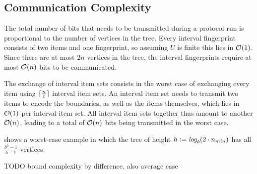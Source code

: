 \subsection{Communication Complexity}

The total number of bits that needs to be transmitted during a protocol run is proportional to the number of vertices in the tree. Every interval fingerprint consists of two items and one fingerprint, so assuming $U$ is finite this lies in $\mathcal{O}(1)$. Since there are at most $2n$ vertices in the tree, the interval fingerprints require at most $\mathcal{O}(n)$ bits to be communicated.

The exchange of interval item sets consists in the worst case of exchanging every item using $\lceil\frac{n}{t}\rceil$ interval item sets. An interval item set needs to transmit two items to encode the boundaries, as well as the items themselves, which lies in $\mathcal{O}(1)$ per interval item set. All interval item sets together thus amount to another $\mathcal{O}(n)$, leading to a total of $\mathcal{O}(n)$ bits being transmitted in the worst case.

 shows a worst-case example in which the tree of height $h \vcentcolon= \mathit{log}_{b}(2 \cdot n_{min})$ has all $\frac{b^{h} - 1}{b - 1}$ vertices. 

TODO bound complexity by difference, also average case

